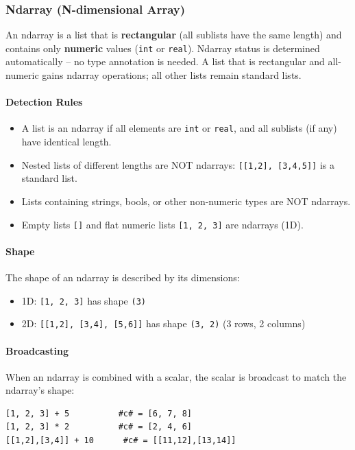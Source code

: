 \documentclass{report}
\begin{document}
\subsubsection{Ndarray (N-dimensional Array)}
An ndarray is a list that is \textbf{rectangular} (all sublists have the same length) and contains only \textbf{numeric} values (\texttt{int} or \texttt{real}). Ndarray status is determined automatically -- no type annotation is needed. A list that is rectangular and all-numeric gains ndarray operations; all other lists remain standard lists.

\paragraph{Detection Rules}
\begin{itemize}
\item A list is an ndarray if all elements are \texttt{int} or \texttt{real}, and all sublists (if any) have identical length.
\item Nested lists of different lengths are NOT ndarrays: \texttt{[[1,2], [3,4,5]]} is a standard list.
\item Lists containing strings, bools, or other non-numeric types are NOT ndarrays.
\item Empty lists \texttt{[]} and flat numeric lists \texttt{[1, 2, 3]} are ndarrays (1D).
\end{itemize}

\paragraph{Shape}
The shape of an ndarray is described by its dimensions:
\begin{itemize}
\item 1D: \texttt{[1, 2, 3]} has shape \texttt{(3)}
\item 2D: \texttt{[[1,2], [3,4], [5,6]]} has shape \texttt{(3, 2)} (3 rows, 2 columns)
\end{itemize}

\paragraph{Broadcasting}
When an ndarray is combined with a scalar, the scalar is broadcast to match the ndarray's shape:
\begin{verbatim}
[1, 2, 3] + 5          #c# = [6, 7, 8]
[1, 2, 3] * 2          #c# = [2, 4, 6]
[[1,2],[3,4]] + 10      #c# = [[11,12],[13,14]]
\end{verbatim}
\end{document}
